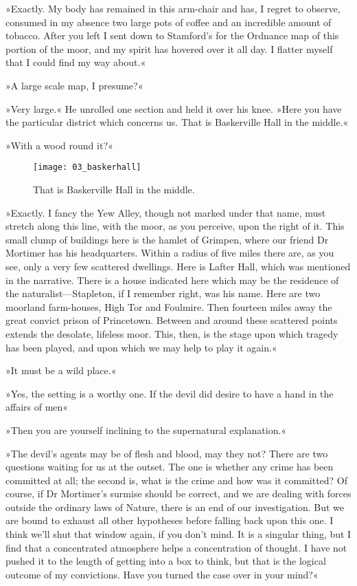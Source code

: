 »Exactly. My body has remained in this arm-chair and has, I regret to observe, consumed in my absence two large pots of coffee and an incredible amount of tobacco. After you left I sent down to Stamford's for the Ordnance map of this portion of the moor, and my spirit has hovered over it all day. I flatter myself that I could find my way about.«

»A large scale map, I presume?«

»Very large.« He unrolled one section and held it over his knee. »Here you have the particular district which concerns us. That is Baskerville Hall in the middle.«

»With a wood round it?«

\begin{figure}[tbhp]
\centering
\texttt{[image: 03\_baskerhall]}
\caption{That is Baskerville Hall in the middle.}
\end{figure}

»Exactly. I fancy the Yew Alley, though not marked under that name, must stretch along this line, with the moor, as you perceive, upon the right of it. This small clump of buildings here is the hamlet of Grimpen, where our friend Dr Mortimer has his headquarters. Within a radius of five miles there are, as you see, only a very few scattered dwellings. Here is Lafter Hall, which was mentioned in the narrative. There is a house indicated here which may be the residence of the naturalist\allowbreak---\allowbreak Stapleton, if I remember right, was his name. Here are two moorland farm-houses, High Tor and Foulmire. Then fourteen miles away the great convict prison of Princetown. Between and around these scattered points extends the desolate, lifeless moor. This, then, is the stage upon which tragedy has been played, and upon which we may help to play it again.«

»It must be a wild place.«

»Yes, the setting is a worthy one. If the devil did desire to have a hand in the affairs of men\longdash «

»Then you are yourself inclining to the supernatural explanation.«

»The devil's agents may be of flesh and blood, may they not? There are two questions waiting for us at the outset. The one is whether any crime has been committed at all; the second is, what is the crime and how was it committed? Of course, if Dr Mortimer's surmise should be correct, and we are dealing with forces outside the ordinary laws of Nature, there is an end of our investigation. But we are bound to exhaust all other hypotheses before falling back upon this one. I think we'll shut that window again, if you don't mind. It is a singular thing, but I find that a concentrated atmosphere helps a concentration of thought. I have not pushed it to the length of getting into a box to think, but that is the logical outcome of my convictions. Have you turned the case over in your mind?«

